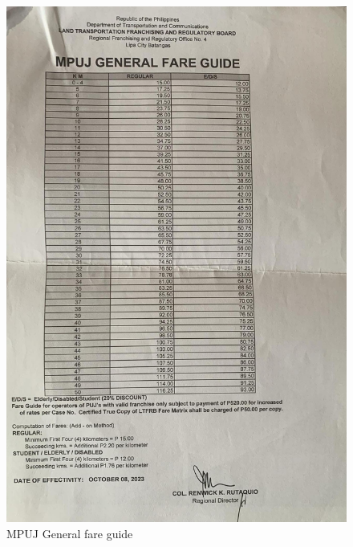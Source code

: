 \documentclass[journal]{./IEEE/IEEEtran}
\begin{document}
\section{}
\begin{figure}[!h]
    \centering
        \includegraphics[scale=0.14]{./figures/ltfrb/mpuj.jpeg}
    \caption{MPUJ General fare guide}
\end{figure}

\newpage
\end{document}
